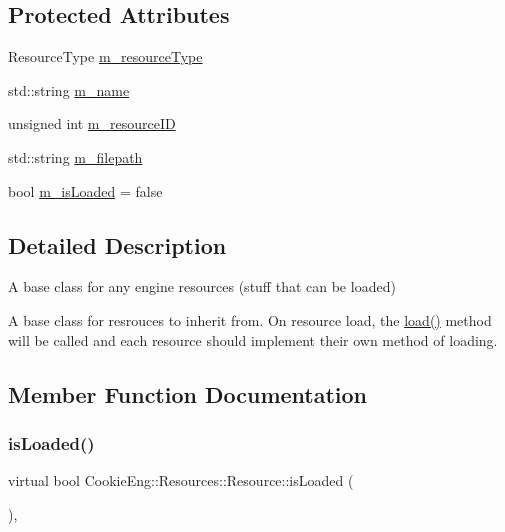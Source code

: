 \subsection*{Protected Attributes}
\begin{DoxyCompactItemize}
\item 
Resource\+Type \hyperlink{class_cookie_eng_1_1_resources_1_1_resource_a3740fe0571f4d65ddf71c36df0d8490c}{m\+\_\+resource\+Type}
\item 
std\+::string \hyperlink{class_cookie_eng_1_1_resources_1_1_resource_ae00a6a02ffb92b14dd72801c5df4d98f}{m\+\_\+name}
\item 
unsigned int \hyperlink{class_cookie_eng_1_1_resources_1_1_resource_a03ca114563713cc8e9965e71fa895da3}{m\+\_\+resource\+ID}
\item 
std\+::string \hyperlink{class_cookie_eng_1_1_resources_1_1_resource_aa7b58e5677b621033ac46b8577b8f48e}{m\+\_\+filepath}
\item 
bool \hyperlink{class_cookie_eng_1_1_resources_1_1_resource_a96c5a11b55f0e497ea0b38e2a1dbf175}{m\+\_\+is\+Loaded} = false
\end{DoxyCompactItemize}


\subsection{Detailed Description}
A base class for any engine resources (stuff that can be loaded) 

A base class for resrouces to inherit from. On resource load, the \hyperlink{class_cookie_eng_1_1_resources_1_1_resource_a75648b8f2e442bebc90d6eb4ea3a2f6e}{load()} method will be called and each resource should implement their own method of loading. 

\subsection{Member Function Documentation}
\mbox{\label{class_cookie_eng_1_1_resources_1_1_resource_a79d4a9f266373ca5b77d8debca83ee7f}} 
\subsubsection{\texorpdfstring{is\+Loaded()}{isLoaded()}}
{\footnotesize\ttfamily virtual bool Cookie\+Eng\+::\+Resources\+::\+Resource\+::is\+Loaded (\begin{DoxyParamCaption}{ }\end{DoxyParamCaption})\hspace{0.3cm}{\ttfamily [inline]}, {\ttfamily [virtual]}}



